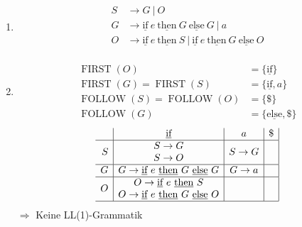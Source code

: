 \documentclass[a4paper,10pt]{scrartcl}
\newcommand{\FIRST}{\operatorname{FIRST}}
\newcommand{\FOLLOW}{\operatorname{FOLLOW}}
\begin{document}
\section{}
\begin{enumerate}
 \item \begin{align*}
        S &\to G\ |\ O \\
        G &\to \underline{\textrm{if}}\ e\ \underline{\textrm{then}}\ G\ \underline{\textrm{else}}\ G\ |\ a \\
        O &\to \underline{\textrm{if}}\ e\ \underline{\textrm{then}}\ S\ |\ \underline{\textrm{if}}\ e\ \underline{\textrm{then}}\ G\ \underline{\textrm{else}}\ O \\
    \end{align*}
 \item   \begin{align*}
          \FIRST(O) &= \{\underline{\textrm{if}}\}\\
          \FIRST(G) = \FIRST(S) &= \{\underline{\textrm{if}}, a\} \\\hline
          \FOLLOW(S) = \FOLLOW(O) &= \{\$\} \\
          \FOLLOW(G) &= \{\underline{\textrm{else}}, \$\}
         \end{align*}
         \[
          \begin{array}{r|c|c|c|}
            & \underline{\textrm{if}} & a & \$ \\\hline
            S & \begin{matrix}
                 S \to G \\
                 S \to O
                \end{matrix} & S \to G & \\\hline
            G & G \to \underline{\textrm{if}}\ e\ \underline{\textrm{then}}\ G\ \underline{\textrm{else}}\ G & G \to a & \\\hline
            O & \begin{matrix}
                 O \to \underline{\textrm{if}}\ e\ \underline{\textrm{then}}\ S  \\
                 O \to \underline{\textrm{if}}\ e\ \underline{\textrm{then}}\ G\ \underline{\textrm{else}}\ O
                \end{matrix} & & \\\hline
 
          \end{array}
         \]
         $\Rightarrow$ Keine LL(1)-Grammatik
\end{enumerate}
\end{document}
